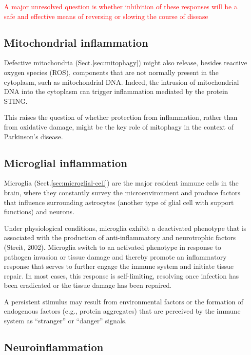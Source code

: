 \textcolor{red}{A  major unresolved question is whether inhibition of these responses 
will be a safe and effective means of reversing or slowing the course of disease}

\subsection{Mitochondrial inflammation}
\label{sec:inflammation-mitochondria}

Defective mitochondria (Sect.\ref{sec:mitophagy}) might also release, besides
reactive oxygen species (ROS), components that are not normally present in the
cytoplasm, such as mitochondrial DNA.
Indeed, the intrusion of mitochondrial DNA into the cytoplasm can trigger
inflammation mediated by the protein STING.

This raises the question of whether protection from inflammation, rather than
from oxidative damage, might be the key role of mitophagy in the context of
Parkinson’s disease.



\subsection{Microglial inflammation}
\label{sec:inflammation-microglial}

Microglia (Sect.\ref{sec:microglial-cell}) are the major resident immune cells
in the brain, where they constantly survey the microenvironment and produce
factors that influence surrounding astrocytes (another type of glial cell with
support functions) and neurons.

Under physiological conditions, microglia exhibit a deactivated phenotype that
is associated with the production of anti-inflammatory and neurotrophic factors
(Streit, 2002). Microglia switch to an activated phenotype in response to
pathogen invasion or tissue damage and thereby promote an inflammatory response
that serves to further engage the immune system and initiate tissue repair. In
most cases, this response is self-limiting, resolving once infection has been
eradicated or the tissue damage has been repaired.

A persistent stimulus may result from environmental factors or the formation of
endogenous factors (e.g., protein aggregates) that are perceived by the immune
system as “stranger” or “danger” signals.




\subsection{Neuroinflammation}
\label{sec:inflammation-neuro}



